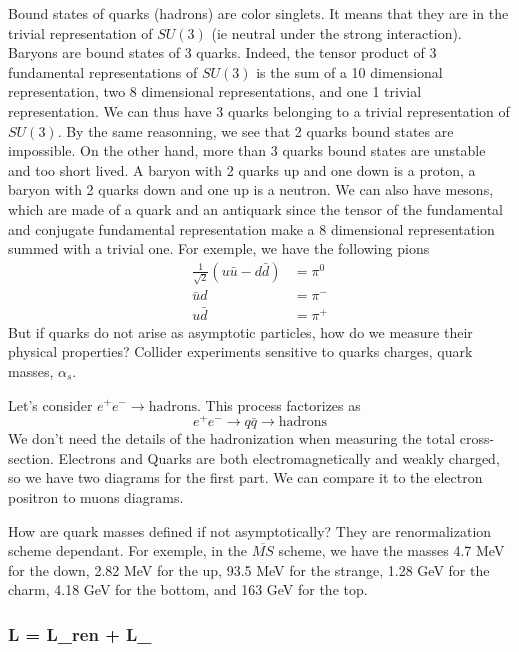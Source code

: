 \documentclass[a4paper]{book}
\theoremstyle{definition}
\theoremstyle{remark}
\begin{document}
Bound states of quarks (hadrons) are color singlets. It means that they are in the trivial representation of $SU(3)$ (ie neutral under the strong interaction). Baryons are bound states of 3 quarks. Indeed, the tensor product of 3 fundamental representations of $SU(3)$ is the sum of a 10 dimensional representation, two 8 dimensional representations, and one 1 trivial representation. We can thus have 3 quarks belonging to a trivial representation of $SU(3)$. By the same reasonning, we see that 2 quarks bound states are impossible. On the other hand, more than 3 quarks bound states are unstable and too short lived. A baryon with 2 quarks up and one down is a proton, a baryon with 2 quarks down and one up is a neutron. We can also have mesons, which are made of a quark and an antiquark since the tensor of the fundamental and conjugate fundamental representation make a 8 dimensional representation summed with a trivial one. For exemple, we have the following pions 
\begin{equation}
    \begin{aligned}
        \frac{1}{\sqrt{2}}(u\bar{u} - d\bar{d}) &= \pi^0 \\
        \bar{u}d &= \pi^- \\ 
        u\bar{d} &= \pi^+
    \end{aligned}
\end{equation}
But if quarks do not arise as asymptotic particles, how do we measure their physical properties? Collider experiments sensitive to quarks charges, quark masses, $\alpha_s$. \par \medskip 
Let's consider $e^+ e^- \rightarrow \text{hadrons}$. This process factorizes as 
\begin{equation}
    e^+ e^- \rightarrow q\bar{q} \rightarrow \text{hadrons}
\end{equation}
We don't need the details of the hadronization when measuring the total cross-section. Electrons and Quarks are both electromagnetically and weakly charged, so we have two diagrams for the first part. We can compare it to the electron positron to muons diagrams. \par \medskip 

How are quark masses defined if not asymptotically? They are renormalization scheme dependant. For exemple, in the $\overline{MS}$ scheme, we have the masses 4.7 MeV for the down, 2.82 MeV for the up, 93.5 MeV for the strange, 1.28 GeV for the charm, 4.18 GeV for the bottom, and 163 GeV for the top.  

\subsubsection{\mathcal L = \mathcal L_{ren} + \mathcal L_{}}
\end{document}
